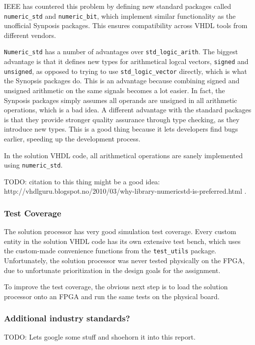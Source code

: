 IEEE has countered this problem by defining new standard packages called \texttt{numeric\_std} and \texttt{numeric\_bit}, which implement similar functionality as the unofficial Synposis packages.
This ensures compatibility across VHDL tools from different vendors.

\texttt{Numeric\_std} has a number of advantages over \texttt{std\_logic\_arith}.
The biggest advantage is that it defines new types for arithmetical logcal vectors, \texttt{signed} and \texttt{unsigned}, as opposed to trying to use \texttt{std\_logic\_vector} directly, which is what the Synopsis packages do.
This is an advantage because combining signed and unsigned arithmetic on the same signals becomes a lot easier.
In fact, the Synposis packages simply assumes all operands are unsigned in all arithmetic operations, which is a bad idea.
A different advantage with the standard packages is that they provide stronger quality assurance through type checking, as they introduce new types.
This is a good thing because it lets developers find bugs earlier, speeding up the development process.

In the solution VHDL code, all arithmetical operations are sanely implemented using \texttt{numeric\_std}.

TODO: citation to this thing might be a good idea: http://vhdlguru.blogspot.no/2010/03/why-library-numericstd-is-preferred.html .

\subsubsection{Test Coverage}

The solution processor has very good simulation test coverage.
Every custom entity in the solution VHDL code has its own extensive test bench, which uses the custom-made convenience functions from the \texttt{test\_utils} package.
Unfortunately, the solution processor was never tested physically on the FPGA, due to unfortunate prioritization in the design goals for the assignment.

To improve the test coverage, the obvious next step is to load the solution processor onto an FPGA and run the same tests on the physical board.

\subsubsection{Additional industry standards?}

TODO: Lets google some stuff and shoehorn it into this report.

